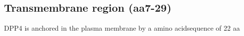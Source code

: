 \subsection{Transmembrane region (aa7-29)}

DPP4 is anchored in the plasma membrane by a amino acidsequence of 22 aa
